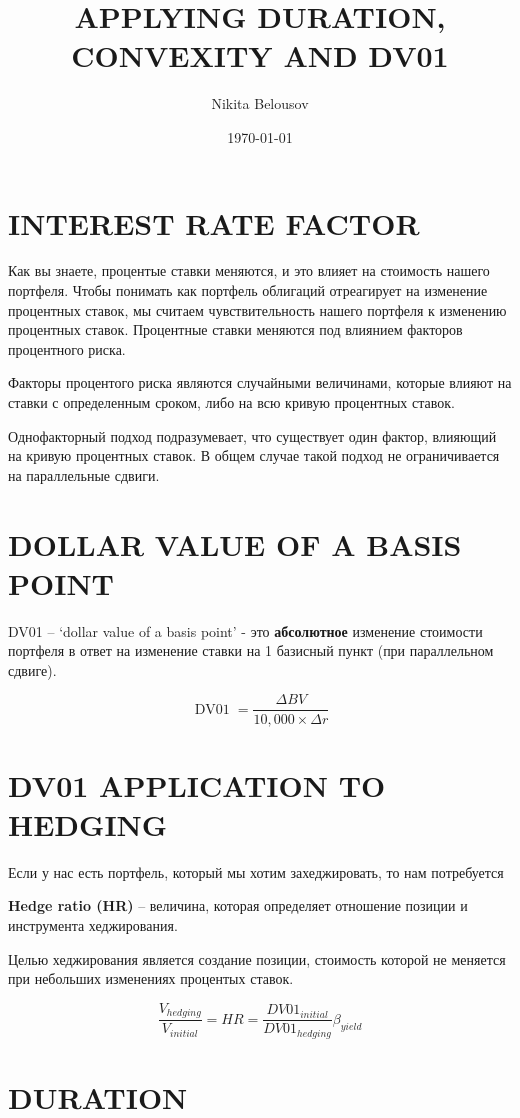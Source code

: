 \documentclass[a4paper,12pt]{article}
\title{APPLYING DURATION, CONVEXITY AND DV01}
\author{Nikita Belousov}
\date{\today}
\begin{document}
\maketitle
\section{INTEREST RATE FACTOR}

Как вы знаете, процентые ставки меняются, и это влияет на стоимость нашего портфеля.
Чтобы понимать как портфель облигаций отреагирует на изменение процентных ставок, мы считаем чувствительность нашего портфеля к изменению процентных ставок.
Процентные ставки меняются под влиянием факторов процентного риска.

Факторы процентого риска являются случайными величинами, которые влияют на ставки с определенным сроком, либо на всю кривую процентных ставок.

Однофакторный подход подразумевает, что существует один фактор,
влияющий на кривую процентных ставок. В общем случае такой подход не ограничивается на параллельные сдвиги.


\section{DOLLAR VALUE OF A BASIS POINT}

DV01 -- `dollar value of a basis point' - это \textbf{абсолютное} изменение стоимости портфеля в ответ на изменение ставки на 1 базисный пункт (при параллельном сдвиге).

\[ \operatorname{DV01} = \frac{\Delta BV}{10,000 \times \Delta r}  \]

\section{DV01 APPLICATION TO HEDGING}

Если у нас есть портфель, который мы хотим захеджировать, то нам потребуется

\textbf{Hedge ratio (HR)} -- величина, которая определяет отношение  позиции и инструмента хеджирования.

Целью хеджирования является создание позиции, стоимость которой не меняется при небольших изменениях процентых ставок.

\[ \frac{V_{hedging}}{V_{initial}} = HR = \frac{DV01_{initial}}{DV01_{hedging}}\beta_{yield}  \]

\section{DURATION}
\end{document}

